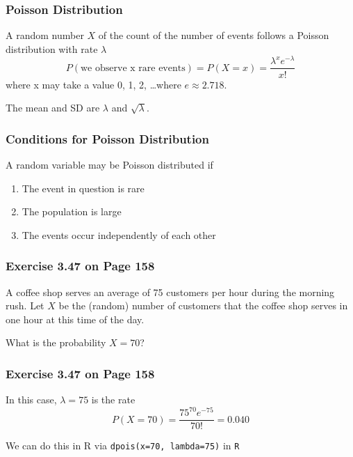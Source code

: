 \documentclass[handout]{beamer}
\newcommand{\blue}[1]{\textcolor{blue2}{#1}}
\begin{document}
\begin{frame}
\frametitle{Poisson Distribution}
%
%
A random number $X$ of the count of the number of events follows a Poisson distribution with rate $\lambda$
\[
    P(\mbox{we observe x rare events}) = P(X=x) = \frac{\lambda^x e^{-\lambda}}{x!}
\]
\pause where x may take a value 0, 1, 2, \ldots where $e \approx 2.718$.

\vspace{0.5cm}

\pause The mean and SD are $\lambda$ and $\sqrt{\lambda}$.

\end{frame}


\begin{frame}
\frametitle{Conditions for Poisson Distribution}

%
%
A random variable \blue{may} be Poisson distributed if

\begin{enumerate}
\pause\item The event in question is rare
\pause\item The population is large
\pause\item The events occur independently of each other
\end{enumerate}

\end{frame}


\begin{frame}
\frametitle{Exercise 3.47 on Page 158}
%
%
A coffee shop serves an average of 75 customers per hour during the morning rush.  Let $X$ be the (random) number of customers that the coffee shop serves in one hour at this time of the day.  

\vspace{0.5cm}

What is the probability $X=70$?

\end{frame}


\begin{frame}
\frametitle{Exercise 3.47 on Page 158}
%
%
In this case, $\lambda=75$ is the rate
\[
P(X=70) = \frac{75^{70} e^{-75}}{70!} = 0.040
\]

\pause\vspace{0.25cm}

We can do this in R via {\tt dpois(x=70, lambda=75)} in {\tt R}

\end{frame}
\end{document}
